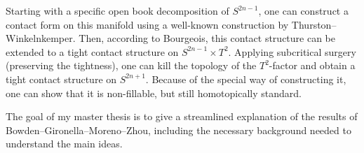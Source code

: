 Starting with a specific open book decomposition of $S^{2n-1}$, one can construct a contact form on this manifold using a well-known construction by Thurston--Winkelnkemper. Then, according to Bourgeois, this contact structure can be extended to a tight contact structure on $S^{2n-1}\times T^2$.
Applying subcritical surgery (preserving the tightness), one can kill the topology of the $T^2$-factor and obtain a tight contact structure on $S^{2n+1}$. Because of the special way of constructing it, one can show that it is non-fillable, but still homotopically standard.

The goal of my master thesis is to give a streamlined explanation of 
the results of Bowden--Gironella--Moreno--Zhou, including the necessary background needed to understand the main ideas.